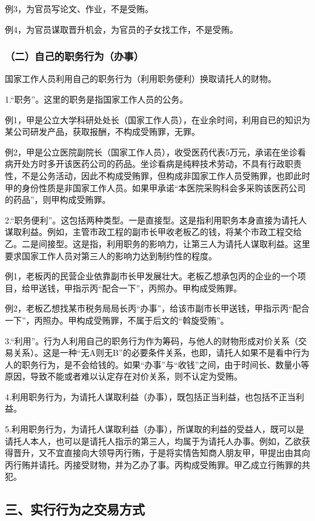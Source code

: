 例3，为官员写论文、作业，不是受贿。

例4，为官员谋取晋升机会，为官员的子女找工作，不是受贿。

\subsubsection*{（二）自己的职务行为（办事）}

国家工作人员利用自己的职务行为（利用职务便利）换取请托人的财物。

1.“职务”。这里的职务是指国家工作人员的公务。

例1，甲是公立大学科研处处长（国家工作人员），在业余时间，利用自已的知识为某公司研发产品，获取报酬，不构成受贿罪，无罪。

例2，甲是公立医院副院长（国家工作人员），收受医药代表5万元，承诺在坐诊看病开处方时多开该医药公司的药品。坐诊看病是纯粹技术劳动，不具有行政职责性，不是公务活动，因此不构成受贿罪，但构成非国家工作人员受贿罪，也即此时甲的身份性质是非国家工作人员。如果甲承诺“本医院采购科会多采购该医药公司的药品”，则甲构成受贿罪。

2.“职务便利”。这包括两种类型。一是直接型。这是指利用职务本身直接为请托人谋取利益。例如，主管市政工程的副市长甲收老板乙的钱，将某个市政工程交给乙。二是间接型。这是指，利用职务的影响力，让第三人为请托人谋取利益。这里要求国家工作人员对第三人的影响力达到制约性的程度。

例1，老板丙的民营企业依靠副市长甲发展壮大。老板乙想承包丙的企业的一个项目，给甲送钱，甲指示丙“配合一下”，丙照办。甲构成受贿罪。

例2，老板乙想找某市税务局局长丙“办事”，给该市副市长甲送钱，甲指示丙“配合一下”，丙照办。甲构成受贿罪，不属于后文的“斡旋受贿”。

3.“利用”。行为人利用自己的职务行为作为筹码，与他人的财物形成对价关系（交易关系）。这是一种“无A则无B”的必要条件关系，也即，请托人如果不是看中行为人的职务行为，是不会给钱的。如果“办事”与“收钱”之间，由于时间长、数量小等原因，导致不能或者难以认定存在对价关系，则不认定为受贿。

4.利用职务行为，为请托人谋取利益（办事），既包括正当利益，也包括不正当利益。

5.利用职务行为，为请托人谋取利益（办事），所谋取的利益的受益人，既可以是请托人本人，也可以是请托人指示的第三人，均属于为请托人办事。例如，乙欲获得晋升，又不宜直接向大领导丙行贿，于是将实情告知商人朋友甲，甲提出由其向丙行贿并请托。丙接受财物，并为乙办了事。丙构成受贿罪。甲乙成立行贿罪的共犯。

\subsection*{三、实行行为之交易方式}

